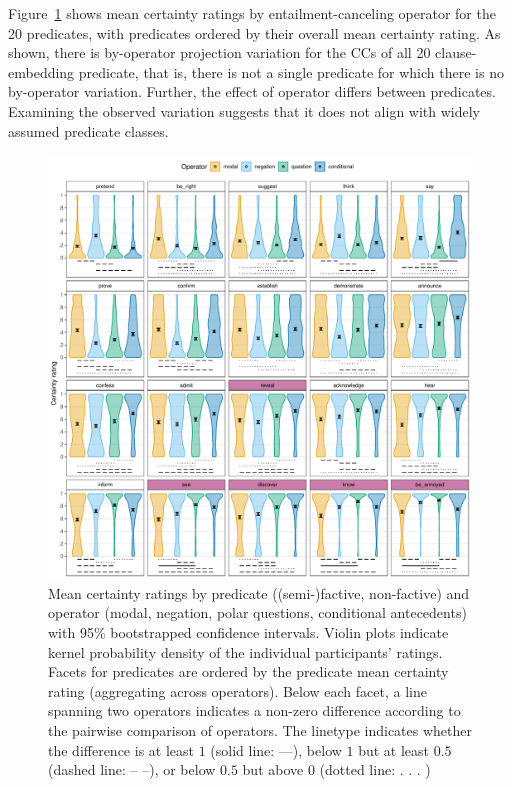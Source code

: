 \documentclass[a4paper,12pt,twoside]{article}
\begin{document}
        Figure~\ref{fig:op-pred-analysis} shows mean certainty ratings by entailment-canceling operator for the 20  predicates, with predicates ordered by their overall mean certainty rating.
        As shown, there is by-operator projection variation for the CCs of all 20 clause-embedding predicate, that is, there is not a single predicate for which there is no by-operator variation. Further, the effect of operator differs between predicates. Examining the observed variation suggests that it does not align with widely assumed predicate classes.

         \begin{figure}[ht!]
            \centering
    		\includegraphics[width = .9\linewidth]{analysis.pdf}
    		\caption{Mean certainty ratings by predicate (\textcolor{pred-fcv-color}{(semi-)factive}, non-factive) and operator (\textcolor{op-m-color}{modal},  \textcolor{op-n-color}{negation}, \textcolor{op-q-color}{polar questions}, \textcolor{op-c-color}{conditional antecedents}) with 95\% bootstrapped confidence intervals. Violin plots indicate kernel probability density of the individual participants' ratings. Facets for predicates are ordered by the predicate mean certainty rating (aggregating across operators). Below each facet, a line spanning two operators indicates a non-zero difference according to the pairwise comparison of operators. The linetype indicates whether the difference is
            at least $1$ (solid line: —),
            below $1$ but at least $0.5$ (dashed line: – –),
            or below $0.5$ but above $0$ (dotted line: . . . )}
    		\label{fig:op-pred-analysis}
    	\end{figure}
\end{document}
